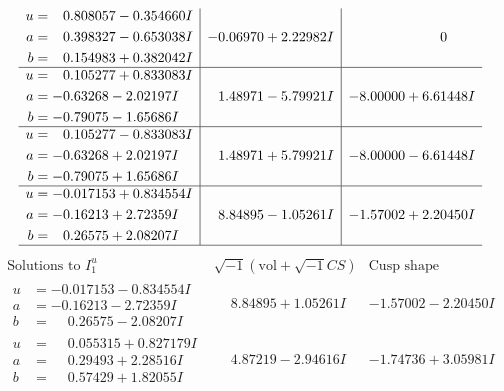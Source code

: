 \documentclass[1p]{elsarticle_modified}
\theoremstyle{definition}
\newcommand{\I}{\sqrt{-1}}
\begin{document}
$$\begin{array}{c|c|c}
\begin{aligned}
u &= \phantom{-}0.808057 - 0.354660 I \\
a &= \phantom{-}0.398327 - 0.653038 I \\
b &= \phantom{-}0.154983 + 0.382042 I\end{aligned}
 & -0.06970 + 2.22982 I & \phantom{-0.000000 } 0 \\ \hline\begin{aligned}
u &= \phantom{-}0.105277 + 0.833083 I \\
a &= -0.63268 - 2.02197 I \\
b &= -0.79075 - 1.65686 I\end{aligned}
 & \phantom{-}1.48971 - 5.79921 I & -8.00000 + 6.61448 I \\ \hline\begin{aligned}
u &= \phantom{-}0.105277 - 0.833083 I \\
a &= -0.63268 + 2.02197 I \\
b &= -0.79075 + 1.65686 I\end{aligned}
 & \phantom{-}1.48971 + 5.79921 I & -8.00000 - 6.61448 I \\ \hline\begin{aligned}
u &= -0.017153 + 0.834554 I \\
a &= -0.16213 + 2.72359 I \\
b &= \phantom{-}0.26575 + 2.08207 I\end{aligned}
 & \phantom{-}8.84895 - 1.05261 I & -1.57002 + 2.20450 I\\
 \hline 
 \end{array}$$\newpage$$\begin{array}{c|c|c}  
\text{Solutions to }I^u_{1}& \I (\text{vol} + \sqrt{-1}CS) & \text{Cusp shape}\\
 \hline 
\begin{aligned}
u &= -0.017153 - 0.834554 I \\
a &= -0.16213 - 2.72359 I \\
b &= \phantom{-}0.26575 - 2.08207 I\end{aligned}
 & \phantom{-}8.84895 + 1.05261 I & -1.57002 - 2.20450 I \\ \hline\begin{aligned}
u &= \phantom{-}0.055315 + 0.827179 I \\
a &= \phantom{-}0.29493 + 2.28516 I \\
b &= \phantom{-}0.57429 + 1.82055 I\end{aligned}
 & \phantom{-}4.87219 - 2.94616 I & -1.74736 + 3.05981 I \\ \hline\begin{aligned}

\end{aligned}
\end{array}$$
\end{document}
